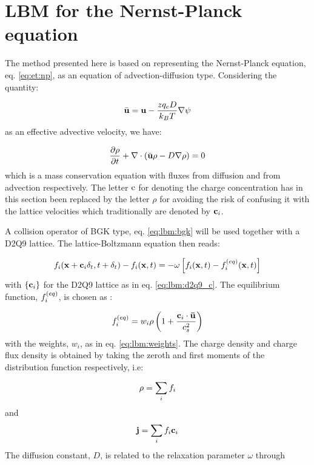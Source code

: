 \section{LBM for the Nernst-Planck equation} 
The method presented here is based on representing the Nernst-Planck
equation, eq. \eqref{eq:et:np}, as an equation of advection-diffusion
type. Considering the quantity:  

\begin{equation}
\bar{\mathbf{u}} = \mathbf{u} -
  \frac{zq_eD}{k_BT}\nabla\mathrm{\psi}
\end{equation}
as an effective advective velocity, we have:

\begin{equation}\label{eq:lbm:adv-dif}
\dfrac{\partial \rho}{\partial t} + \nabla \cdot ( \bar{\mathbf{u}} \rho -
  D\nabla \rho ) = 0
\end{equation}
which is a mass conservation equation with fluxes from diffusion and
from advection respectively. The letter $\mathrm{c}$ for denoting the charge
concentration has in this section been replaced by the letter $\rho$
for avoiding the risk of confusing it with the lattice velocities
which traditionally are denoted by ${\mathbf{c}_i}$.

A collision operator of BGK type, eq. \eqref{eq:lbm:bgk} will be used
together with a D2Q9 lattice. The lattice-Boltzmann equation then
reads:

\begin{equation}
f_i(\mathbf{x} + \mathbf{c}_i\delta_t, t + \delta_t) - f_i(\mathbf{x}, t) = -\omega \left[ f_i(\mathbf{x}, t) - f_i^{(eq)}(\mathbf{x}, t) \right]
\end{equation}
with $\{\mathbf{c}_i\}$ for the D2Q9 lattice as in
eq. \eqref{eq:lbm:d2q9_c}. The equilibrium function, $f_i^{(eq)}$, is chosen
as \cite{alexey-tobias}:

\begin{equation}\label{eq:lbm:np_feq}
f_i^{(eq)} = w_i \rho \left ( 1 + \frac{\mathbf{c}_i \cdot \mathbf{\bar{u}}}{c_s^2} \right)
\end{equation}
with the weights, $w_i$, as in eq. \eqref{eq:lbm:weights}. The charge
density and charge flux density is obtained by taking the zeroth and
first moments of the distribution function respectively, i.e:

\begin{equation}\label{eq:lbm:rho_mom}
\rho = \sum_i f_i
\end{equation}
and
\begin{equation}\label{eq:lbm:j_mom}
\mathbf{j} = \sum_i f_i \mathbf{c}_i
\end{equation}
The diffusion constant, $D$, is related to the relaxation parameter
$\omega$ through 

